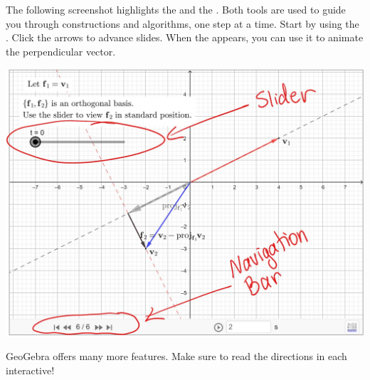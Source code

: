 \documentclass{ximera}
\begin{document}
\begin{center}
\end{center}

The following screenshot highlights the  and the .  Both tools are used to guide you through constructions and algorithms, one step at a time.  Start by using the .  Click the arrows to advance slides.  When the  appears, you can use it to animate the perpendicular vector.
\begin{image}
\includegraphics{GeoGebraScreenshot1.jpg}
\end{image}

\begin{center}
\end{center}
GeoGebra offers many more features.  Make sure to read the directions in each interactive!
\end{document}
